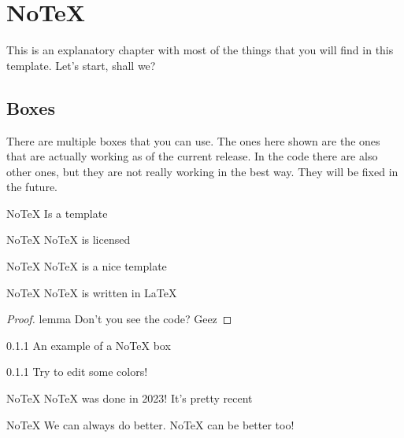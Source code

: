 \chapter{NoTeX}

\noindent This is an explanatory chapter with most of the things that you will find in this template. Let's start, shall we?

\section{Boxes}

\noindent There are multiple boxes that you can use. The ones here shown are the ones that are actually working as of the current release. In the code there are also other ones, but they are not really working in the best way. They will be fixed in the future.

\begin{definition}{NoTeX}
    Is a template
\end{definition}

\begin{corollary}{NoTeX}
    NoTeX is licensed
\end{corollary}

\begin{theorem}{NoTeX}
    NoTeX is a nice template
\end{theorem}

\begin{lemma}{NoTeX}
    NoTeX is written in \LaTeX
    \\
\end{lemma}

\begin{proof}{lemma}
    Don't you see the code? Geez
\end{proof}

\begin{example}{0.1.1}
    An example of a NoTeX box
\end{example}

\begin{exercise}{0.1.1}
    Try to edit some colors!
\end{exercise}

\begin{curiosity}{NoTeX}
    NoTeX was done in 2023! It's pretty recent
\end{curiosity}

\begin{remark}{NoTeX}
    We can always do better. NoTeX can be better too!
\end{remark}